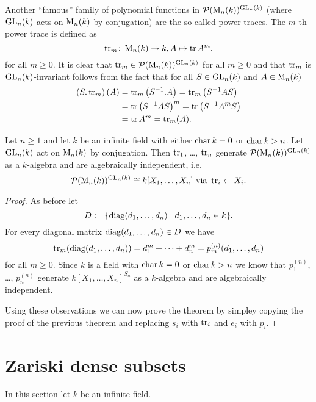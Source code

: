 Another ``famous'' family of polynomial functions in $\mathcal{P}(\operatorname{M}_n(k))^{\operatorname{GL}_n(k)}$ (where $\operatorname{GL}_n(k)$ acts on $\operatorname{M}_n(k)$ by conjugation) are the so called power traces.
The $m$-th power trace is defined as
\[
          \operatorname{tr}_m
  \colon  \operatorname{M}_n(k)
  \to     k,
          A
  \mapsto \operatorname{tr} A^m.
\]
for all $m \geq 0$.
It is clear that $\operatorname{tr}_m \in \mathcal{P}(\operatorname{M}_n(k))^{\operatorname{GL}_n(k)}$ for all $m \geq 0$ and that $\operatorname{tr}_m$ is $\operatorname{GL}_n(k)$-invariant follows from the fact that for all $S \in \operatorname{GL}_n(k)$ and $A \in \operatorname{M}_n(k)$
\begin{align*}
      \left( S.\operatorname{tr}_m \right)(A)
  &=  \operatorname{tr}_m\left( S^{-1}.A \right)
   =  \operatorname{tr}_m\left( S^{-1} A S \right)  \\
  &=  \operatorname{tr} \left( S^{-1} A S \right)^m
   =  \operatorname{tr} \left( S^{-1} A^m S \right) \\
  &=  \operatorname{tr} A^m
   =  \operatorname{tr}_m(A).
\end{align*}


\begin{thrm}
  Let $n \geq 1$ and let $k$ be an infinite field with either $\operatorname{char} k = 0$ or $\operatorname{char} k > n$.
  Let $\operatorname{GL}_n(k)$ act on $\operatorname{M}_n(k)$ by conjugation.
  Then $\operatorname{tr}_1$, \dots, $\operatorname{tr}_n$ generate $\mathcal{P}(\operatorname{M}_n(k))^{\operatorname{GL}_n(k)}$ as a $k$-algebra and are algebraically independent, i.e.\
  \[
          \mathcal{P}(\operatorname{M}_n(k))^{\operatorname{GL}_n(k)}
    \cong k[X_1, \dotsc, X_n]
    \text{ via }
              \operatorname{tr}_i
    \mapsfrom X_i.
  \]
\end{thrm}
\begin{proof}
  As before let 
  \[
              D
    \coloneqq \{
                \operatorname{diag}(d_1, \dotsc, d_n)
              \mid
                    d_1, \dotsc, d_n
                \in k
              \}.
  \]
  For every diagonal matrix $\operatorname{diag}(d_1, \dotsc, d_n) \in D$ we have
  \[
      \operatorname{tr}_m( \operatorname{diag}(d_1, \dotsc, d_n) )
    = d_1^m + \dotsb + d_n^m
    = p^{(n)}_m(d_1, \dotsc, d_n)
  \]
  for all $m \geq 0$.
  Since $k$ is a field with $\operatorname{char} k = 0$ or $\operatorname{char} k > n$ we know that $p^{(n)}_1$, \dots, $p^{(n)}_n$ generate $k[X_1, \dotsc, X_n]^{S_n}$ as a $k$-algebra and are algebraically independent.
  
  Using these observations we can now prove the theorem by simpley copying the proof of the previous theorem and replacing $s_i$ with $\operatorname{tr}_i$ and $e_i$ with $p_i$.
\end{proof}





\section{Zariski dense subsets}
In this section let $k$ be an infinite field.


